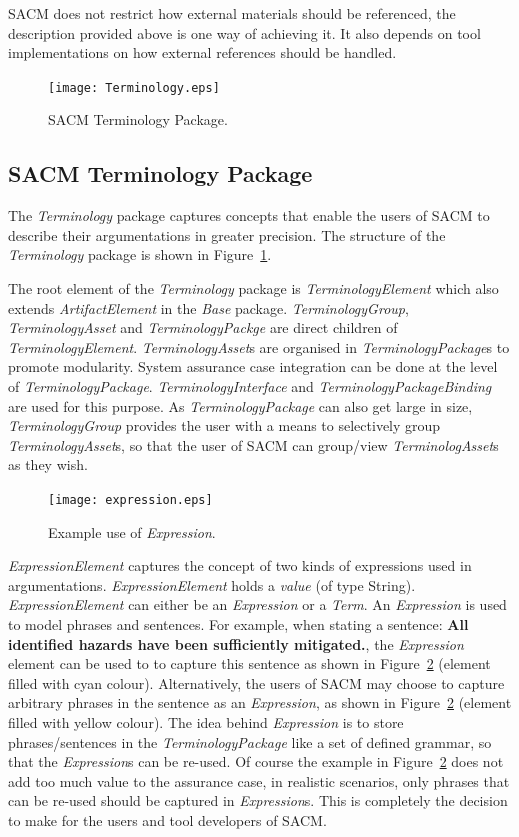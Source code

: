 SACM does not restrict how external materials should be referenced, the description provided above is one way of achieving it. It also depends on tool implementations on how external references should be handled. 
\begin{figure}[ht!]
	\centering
	\texttt{[image: Terminology.eps]}
	\caption{SACM Terminology Package.}
	\label{fig:term}
\end{figure}
\subsection{SACM Terminology Package}
\label{sec:termPack}
The \textit{Terminology} package captures concepts that enable the users of SACM to describe their argumentations in greater precision. The structure of the \textit{Terminology} package is shown in Figure~\ref{fig:term}.

The root element of the \textit{Terminology} package is \textit{TerminologyElement} which also extends \textit{ArtifactElement} in the \textit{Base} package. \textit{TerminologyGroup}, \textit{TerminologyAsset} and \textit{TerminologyPackge} are direct children of \textit{TerminologyElement}. \textit{TerminologyAsset}s are organised in \textit{TerminologyPackage}s to promote modularity. System assurance case integration can be done at the level of \textit{TerminologyPackage}. \textit{TerminologyInterface} and \textit{TerminologyPackageBinding} are used for this purpose. 
As \textit{TerminologyPackage} can also get large in size, \textit{TerminologyGroup} provides the user with a means to selectively group \textit{TerminologyAsset}s, so that the user of SACM can group/view \textit{TerminologAsset}s as they wish.

\begin{figure}
	\centering
	\texttt{[image: expression.eps]}
	\caption{Example use of \textit{Expression}.}
	\label{fig:expression}
\end{figure}

\textit{ExpressionElement} captures the concept of two kinds of expressions used in argumentations. \textit{ExpressionElement} holds a \textit{value} (of type String). \textit{ExpressionElement} can either be an \textit{Expression} or a \textit{Term}. An \textit{Expression} is used to model phrases and sentences. For example, when stating a sentence: \textbf{All identified hazards have been sufficiently mitigated.}, the \textit{Expression} element can be used to to capture this sentence as shown in Figure~\ref{fig:expression} (element filled with cyan colour). Alternatively, the users of SACM may choose to capture arbitrary phrases in the sentence as an \textit{Expression}, as shown in Figure~\ref{fig:expression} (element filled with yellow colour). The idea behind \textit{Expression} is to store phrases/sentences in the \textit{TerminologyPackage} like a set of defined grammar, so that the \textit{Expression}s can be re-used. Of course the example in Figure~\ref{fig:expression} does not add too much value to the assurance case, in realistic scenarios, only phrases that can be re-used should be captured in \textit{Expression}s. This is completely the decision to make for the users and tool developers of SACM. 

